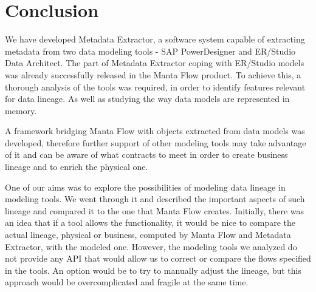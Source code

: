 \chapter*{Conclusion}
We have developed Metadata Extractor, a software system capable of extracting metadata from two data modeling tools - SAP PowerDesigner and ER/Studio Data Architect. 
The part of Metadata Extractor coping with ER/Studio models was already successfully released in the Manta Flow product.
To achieve this, a thorough analysis of the tools was required, in order to identify features relevant for data lineage. As well as studying the way data models are represented in memory.

A framework bridging Manta Flow with objects extracted from data models was developed, therefore further support of other modeling tools may take advantage of it and can be aware of what contracts to meet in order to create business lineage and to enrich the physical one.

One of our aims was to explore the possibilities of modeling data lineage in modeling tools.
We went through it and described the important aspects of such lineage and compared it to the one that Manta Flow creates. 
Initially, there was an idea that if a tool allows the functionality, it would be nice to compare the actual lineage, physical or business, computed by Manta Flow and Metadata Extractor, with the modeled one. 
However, the modeling tools we analyzed do not provide any API that would allow us to correct or compare the flows specified in the tools. 
An option would be to try to manually adjust the lineage, but this approach would be overcomplicated and fragile at the same time.

